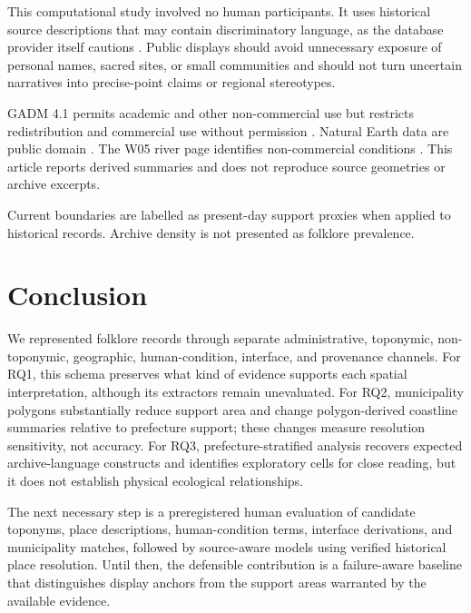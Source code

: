 \documentclass[9pt,twocolumn,a4paper]{extarticle}
\begin{document}
This computational study involved no human participants. It uses historical source descriptions that may contain discriminatory language, as the database provider itself cautions \citep{nichibun2025}. Public displays should avoid unnecessary exposure of personal names, sacred sites, or small communities and should not turn uncertain narratives into precise-point claims or regional stereotypes.

GADM 4.1 permits academic and other non-commercial use but restricts redistribution and commercial use without permission \citep{gadm41}. Natural Earth data are public domain \citep{naturalearth}. The W05 river page identifies non-commercial conditions \citep{mlitw05}. This article reports derived summaries and does not reproduce source geometries or archive excerpts.

Current boundaries are labelled as present-day support proxies when applied to historical records. Archive density is not presented as folklore prevalence.


\section{Conclusion}

We represented \ArchiveRecords{} folklore records through separate administrative, toponymic, non-toponymic, geographic, human-condition, interface, and provenance channels. For RQ1, this schema preserves what kind of evidence supports each spatial interpretation, although its extractors remain unevaluated. For RQ2, municipality polygons substantially reduce support area and change polygon-derived coastline summaries relative to prefecture support; these changes measure resolution sensitivity, not accuracy. For RQ3, prefecture-stratified analysis recovers expected archive-language constructs and identifies exploratory cells for close reading, but it does not establish physical ecological relationships.

The next necessary step is a preregistered human evaluation of candidate toponyms, place descriptions, human-condition terms, interface derivations, and municipality matches, followed by source-aware models using verified historical place resolution. Until then, the defensible contribution is a failure-aware baseline that distinguishes display anchors from the support areas warranted by the available evidence.



\begingroup
\fontsize{8}{9}\selectfont


\endgroup
\end{document}
